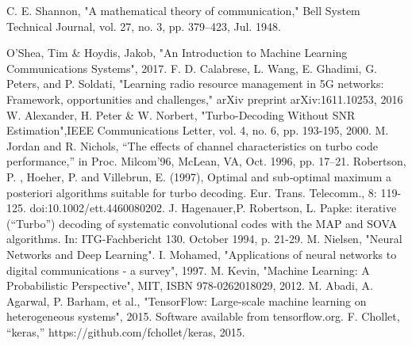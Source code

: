\documentclass[conference]{IEEEtran}
\begin{document}
\begin{thebibliography}{00}
 C. E. Shannon, "A mathematical theory of communication," Bell System Technical Journal, vol. 27, no. 3, pp. 379–423, Jul. 1948.

 O'Shea, Tim \& Hoydis, Jakob, "An Introduction to Machine Learning Communications Systems", 2017.
 F. D. Calabrese, L. Wang, E. Ghadimi, G. Peters, and P. Soldati,
"Learning radio resource management in 5G networks: Framework,
opportunities and challenges," arXiv preprint arXiv:1611.10253, 2016
 W. Alexander, H. Peter \& W. Norbert, "Turbo-Decoding Without SNR Estimation",IEEE Communications Letter, vol. 4, no. 6, pp. 193-195, 2000.
 M. Jordan and R. Nichols, “The effects of channel characteristics on turbo code performance,” in Proc. Milcom’96, McLean, VA, Oct. 1996,
pp. 17–21.
 Robertson, P. , Hoeher, P. and Villebrun, E. (1997), Optimal and sub‐optimal maximum a posteriori algorithms suitable for turbo decoding. Eur. Trans. Telecomm., 8: 119-125. doi:10.1002/ett.4460080202.
 J. Hagenauer,P. Robertson, L. Papke: iterative (“Turbo”) decoding of systematic convolutional codes with the MAP and SOVA
algorithms. In: ITG-Fachbericht 130. October 1994, p. 21-29.
 M. Nielsen, "Neural Networks and Deep Learning".
 I. Mohamed, "Applications of neural networks to digital communications - a survey", 1997.
 M. Kevin, "Machine Learning: A Probabilistic Perspective", MIT, ISBN 978-0262018029, 2012.
 M. Abadi, A. Agarwal, P. Barham, et al., 
"TensorFlow: Large-scale machine learning on heterogeneous systems", 2015. Software available from tensorflow.org.
 F. Chollet, “keras,” https://github.com/fchollet/keras, 2015.




\end{thebibliography}
\end{document}
